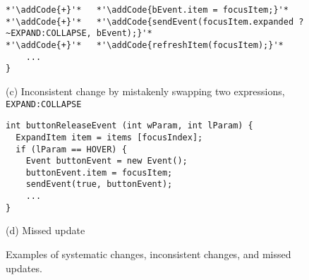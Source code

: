 \begin{figure*}[!t]
\begin{minipage}[t]{0.5\linewidth}
\begin{lstlisting}[style=MyJavaSmallStyle]
*'\addCode{+}'*   *'\addCode{bEvent.item = focusItem;}'*
*'\addCode{+}'*   *'\addCode{sendEvent(focusItem.expanded ?~EXPAND:COLLAPSE, bEvent);}'*
*'\addCode{+}'*   *'\addCode{refreshItem(focusItem);}'*
    ...
}
\end{lstlisting}
\begin{scriptsize}(c) Inconsistent change by mistakenly swapping two expressions, \texttt{EXPAND:COLLAPSE}\end{scriptsize}
\end{minipage}
%
\begin{minipage}[t]{0.5\linewidth}
\begin{lstlisting}[style=MyJavaSmallStyle]
int buttonReleaseEvent (int wParam, int lParam) {
  ExpandItem item = items [focusIndex];
  if (lParam == HOVER) {
    Event buttonEvent = new Event();
    buttonEvent.item = focusItem;
    sendEvent(true, buttonEvent);
    ...
}
\end{lstlisting}
\begin{scriptsize}(d) Missed update\end{scriptsize}
\end{minipage}
%
\caption{Examples of systematic changes, inconsistent changes, and missed updates.}
\label{fig:motiExample}
\end{figure*}

